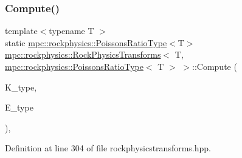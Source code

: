 \subsubsection{\texorpdfstring{Compute()}{Compute()}\hspace{0.1cm}{\footnotesize\ttfamily [5/6]}}
{\footnotesize\ttfamily template$<$typename T $>$ \\
static \mbox{\hyperlink{structmpc_1_1rockphysics_1_1_poissons_ratio_type}{mpc\+::rockphysics\+::\+Poissons\+Ratio\+Type}}$<$T$>$ \mbox{\hyperlink{structmpc_1_1rockphysics_1_1_rock_physics_transforms}{mpc\+::rockphysics\+::\+Rock\+Physics\+Transforms}}$<$ T, \mbox{\hyperlink{structmpc_1_1rockphysics_1_1_poissons_ratio_type}{mpc\+::rockphysics\+::\+Poissons\+Ratio\+Type}}$<$ T $>$ $>$\+::Compute (\begin{DoxyParamCaption}\item[{const \mbox{\hyperlink{structmpc_1_1rockphysics_1_1_bulk_modulus_type}{mpc\+::rockphysics\+::\+Bulk\+Modulus\+Type}}$<$ T $>$ \&}]{K\+\_\+type,  }\item[{const \mbox{\hyperlink{structmpc_1_1rockphysics_1_1_youngs_modulus_type}{mpc\+::rockphysics\+::\+Youngs\+Modulus\+Type}}$<$ T $>$ \&}]{E\+\_\+type }\end{DoxyParamCaption})\hspace{0.3cm}{\ttfamily [inline]}, {\ttfamily [static]}}



Definition at line 304 of file rockphysicstransforms.\+hpp.

\mbox{\label{structmpc_1_1rockphysics_1_1_rock_physics_transforms_3_01_t_00_01mpc_1_1rockphysics_1_1_poissons_ratio_type_3_01_t_01_4_01_4_a3c84bba0a1fa50773de188038b50719e}} 
